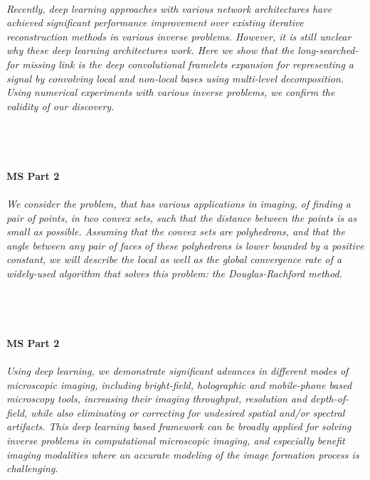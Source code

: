\begin{multicols}{2}
\\  
    \textit{Recently, deep learning approaches with various network architectures have achieved significant performance improvement over existing iterative reconstruction methods in various inverse problems. However,   it is still unclear  why these deep learning architectures work.  Here we show that  the long-searched-for missing link is the deep convolutional framelets expansion for representing a signal by convolving local and non-local bases using multi-level decomposition. Using numerical experiments with various inverse problems,  we confirm the validity of our discovery.}\\
\\ 
    \\
    \\\\
    \noindent\textbf{MS Part 2}\\
\\  
    \textit{We consider the problem, that has various applications in imaging, of finding a pair of points, in two convex sets, such that the distance between the points is as small as possible. Assuming that the convex sets are polyhedrons, and that the angle between any pair of faces of these polyhedrons is lower bounded by a positive constant, we will describe the local as well as the global convergence rate of a widely-used algorithm that solves this problem: the Douglas-Rachford method.}\\
\\ 
    \\
    \\\\
    \noindent\textbf{MS Part 2}\\
\\  
    \textit{Using deep learning, we demonstrate significant advances in different modes of microscopic imaging, including bright-field, holographic and mobile-phone based microscopy tools, increasing their imaging throughput, resolution and depth-of-field, while also eliminating or correcting for undesired spatial and/or spectral artifacts. This deep learning based framework can be broadly applied for solving inverse problems in computational microscopic imaging, and especially benefit imaging modalities where an accurate modeling of the image formation process is challenging.}\\
\\ 
    \\

\end{multicols}

